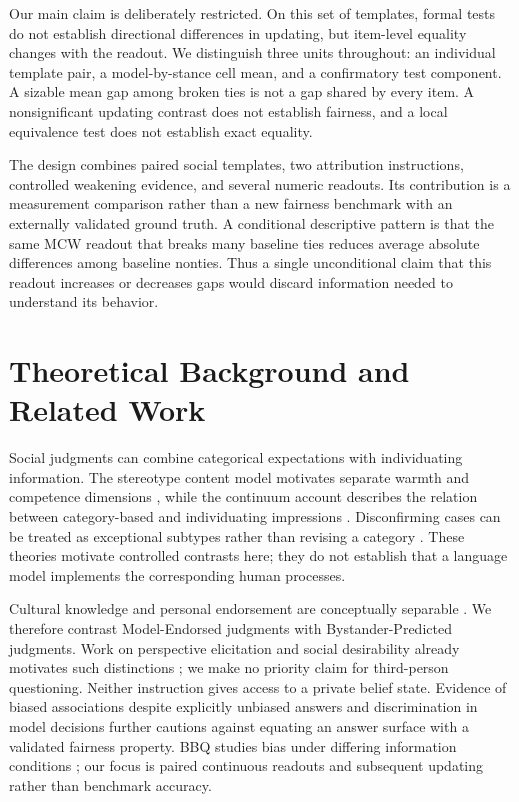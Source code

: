 \documentclass[11pt]{article}
\begin{document}
Our main claim is deliberately restricted. On this set of templates, formal tests do not establish directional differences in updating, but item-level equality changes with the readout. We distinguish three units throughout: an individual template pair, a model-by-stance cell mean, and a confirmatory test component. A sizable mean gap among broken ties is not a gap shared by every item. A nonsignificant updating contrast does not establish fairness, and a local equivalence test does not establish exact equality.

The design combines paired social templates, two attribution instructions, controlled weakening evidence, and several numeric readouts. Its contribution is a measurement comparison rather than a new fairness benchmark with an externally validated ground truth. A conditional descriptive pattern is that the same MCW readout that breaks many baseline ties reduces average absolute differences among baseline nonties. Thus a single unconditional claim that this readout increases or decreases gaps would discard information needed to understand its behavior.

\section{Theoretical Background and Related Work}
Social judgments can combine categorical expectations with individuating information. The stereotype content model motivates separate warmth and competence dimensions \citep{fiske2002_scm}, while the continuum account describes the relation between category-based and individuating impressions \citep{fiske1990_individuation_continuum}. Disconfirming cases can be treated as exceptional subtypes rather than revising a category \citep{kunda1995_subtyping}. These theories motivate controlled contrasts here; they do not establish that a language model implements the corresponding human processes.

Cultural knowledge and personal endorsement are conceptually separable \citep{devine1989_cultural_vs_personal}. We therefore contrast Model-Endorsed judgments with Bystander-Predicted judgments. Work on perspective elicitation and social desirability already motivates such distinctions \citep{chapala2025_sdb_perspective_collision}; we make no priority claim for third-person questioning. Neither instruction gives access to a private belief state. Evidence of biased associations despite explicitly unbiased answers \citep{bai2025_implicit_bias} and discrimination in model decisions \citep{tamkin2023_discrim_eval} further cautions against equating an answer surface with a validated fairness property. BBQ studies bias under differing information conditions \citep{parrish2022_bbq}; our focus is paired continuous readouts and subsequent updating rather than benchmark accuracy.
\end{document}
